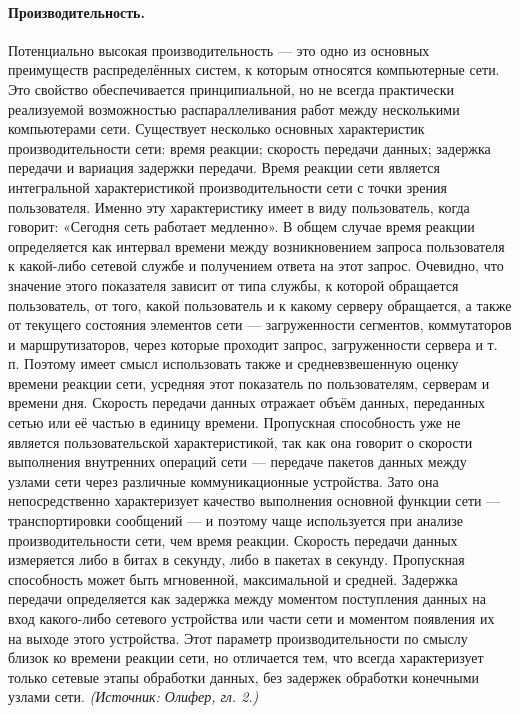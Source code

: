 \documentclass[a4paper,12pt]{article}
\begin{document}
\paragraph{Производительность.}
Потенциально высокая производительность — это одно из основных преимуществ распределённых систем, к которым относятся компьютерные сети. Это свойство обеспечивается принципиальной, но не всегда практически реализуемой возможностью распараллеливания работ между несколькими компьютерами сети. Существует несколько основных характеристик производительности сети: время реакции; скорость передачи данных; задержка передачи и вариация задержки передачи. Время реакции сети является интегральной характеристикой производительности сети с точки зрения пользователя. Именно эту характеристику имеет в виду пользователь, когда говорит: «Сегодня сеть работает медленно». В общем случае время реакции определяется как интервал времени между возникновением запроса пользователя к какой-либо сетевой службе и получением ответа на этот запрос. Очевидно, что значение этого показателя зависит от типа службы, к которой обращается пользователь, от того, какой пользователь и к какому серверу обращается, а также от текущего состояния элементов сети — загруженности сегментов, коммутаторов и маршрутизаторов, через которые проходит запрос, загруженности сервера и т. п. Поэтому имеет смысл использовать также и средневзвешенную оценку времени реакции сети, усредняя этот показатель по пользователям, серверам и времени дня. Скорость передачи данных отражает объём данных, переданных сетью или её частью в единицу времени. Пропускная способность уже не является пользовательской характеристикой, так как она говорит о скорости выполнения внутренних операций сети — передаче пакетов данных между узлами сети через различные коммуникационные устройства. Зато она непосредственно характеризует качество выполнения основной функции сети — транспортировки сообщений — и поэтому чаще используется при анализе производительности сети, чем время реакции. Скорость передачи данных измеряется либо в битах в секунду, либо в пакетах в секунду. Пропускная способность может быть мгновенной, максимальной и средней. Задержка передачи определяется как задержка между моментом поступления данных на вход какого-либо сетевого устройства или части сети и моментом появления их на выходе этого устройства. Этот параметр производительности по смыслу близок ко времени реакции сети, но отличается тем, что всегда характеризует только сетевые этапы обработки данных, без задержек обработки конечными узлами сети.
\textit{(Источник: Олифер, гл. 2.)}
\end{document}

